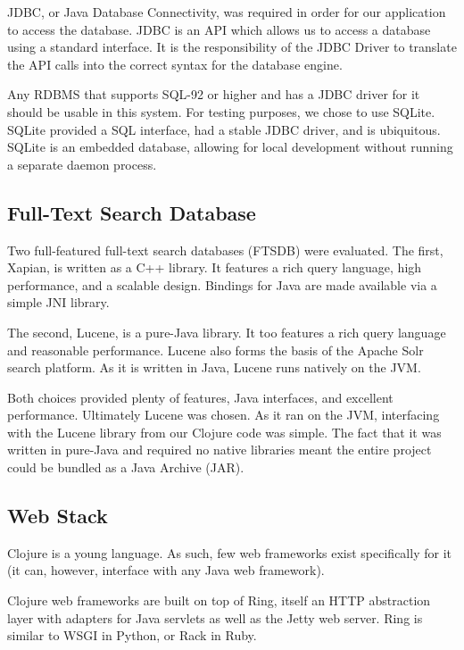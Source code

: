 \documentclass[12pt,letterpaper,oneside,notitlepage]{report}
\theoremstyle{definition}
\begin{document}
				JDBC, or Java Database Connectivity, was required in order for our application to access the database.  JDBC is an API which allows us to access a database using a standard interface.  It is the responsibility of the JDBC Driver to translate the API calls into the correct syntax for the database engine.
				
				Any RDBMS that supports SQL-92 or higher and has a JDBC driver for it should be usable in this system.  For testing purposes, we chose to use SQLite.  SQLite provided a SQL interface, had a stable JDBC driver, and is ubiquitous.  SQLite is an embedded database, allowing for local development without running a separate daemon process.
			
			\subsection{Full-Text Search Database}
				Two full-featured full-text search databases (FTSDB) were evaluated.  The first, Xapian, is written as a C++ library.  It features a rich query language, high performance, and a scalable design\cite{xapian}.  Bindings for Java are made available via a simple JNI library.
				
				The second, Lucene, is a pure-Java library.  It too features a rich query language and reasonable performance.  Lucene also forms the basis of the Apache Solr search platform.  As it is written in Java, Lucene runs natively on the JVM.
				
				Both choices provided plenty of features, Java interfaces, and excellent performance.  Ultimately Lucene was chosen.  As it ran on the JVM, interfacing with the Lucene library from our Clojure code was simple.  The fact that it was written in pure-Java and required no native libraries meant the entire project could be bundled as a Java Archive (JAR).
			
			\subsection{Web Stack}
				Clojure is a young language.  As such, few web frameworks exist specifically for it (it can, however, interface with any Java web framework).  
				
				Clojure web frameworks are built on top of Ring, itself an HTTP abstraction layer with adapters for Java servlets as well as the Jetty web server.  Ring is similar to WSGI in Python, or Rack in Ruby.
				
\end{document}

